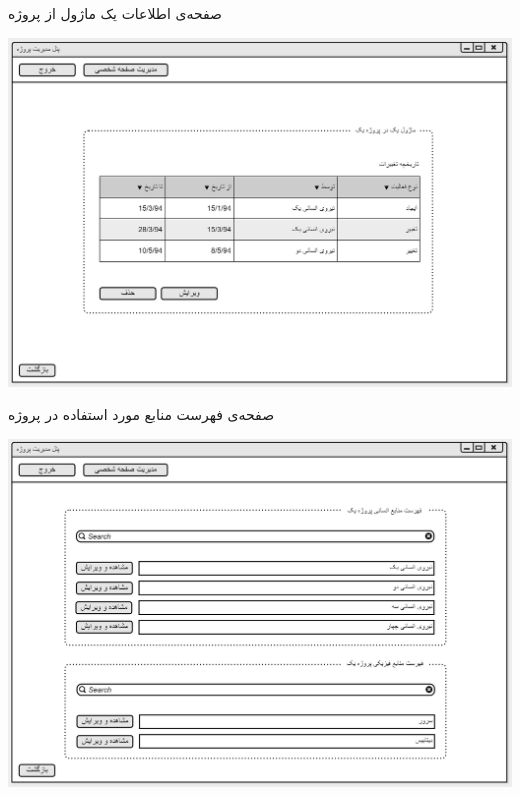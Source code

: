 \documentclass{article}
\begin{document}
\vspace{1cm}
صفحه‌ی اطلاعات یک ماژول از پروژه 
\begin{center}
\includegraphics[width=\textwidth]{Prototype/ProjectManager/ModuleInformation.png}
\end{center}

\newpage
\vspace{1cm}
صفحه‌ی فهرست منابع مورد استفاده در پروژه 
\begin{center}
\includegraphics[width=\textwidth]{Prototype/ProjectManager/ProjectResourcesList.png}
\end{center}
\end{document}
